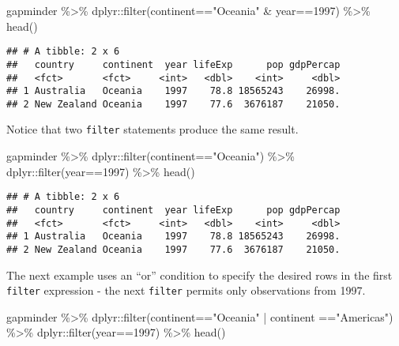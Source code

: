 \documentclass[
]{book}
\newenvironment{Shaded}{\begin{snugshade}}{\end{snugshade}}
\newcommand{\DecValTok}[1]{\textcolor[rgb]{0.00,0.00,0.81}{#1}}
\newcommand{\FunctionTok}[1]{\textcolor[rgb]{0.00,0.00,0.00}{#1}}
\newcommand{\NormalTok}[1]{#1}
\newcommand{\SpecialCharTok}[1]{\textcolor[rgb]{0.00,0.00,0.00}{#1}}
\newcommand{\StringTok}[1]{\textcolor[rgb]{0.31,0.60,0.02}{#1}}
\begin{document}
\begin{Shaded}
\begin{Highlighting}[]
\NormalTok{gapminder }\SpecialCharTok{\%\textgreater{}\%} 
\NormalTok{  dplyr}\SpecialCharTok{::}\FunctionTok{filter}\NormalTok{(continent}\SpecialCharTok{==}\StringTok{"Oceania"} \SpecialCharTok{\&}\NormalTok{ year}\SpecialCharTok{==}\DecValTok{1997}\NormalTok{) }\SpecialCharTok{\%\textgreater{}\%} 
  \FunctionTok{head}\NormalTok{()}
\end{Highlighting}
\end{Shaded}

\begin{verbatim}
## # A tibble: 2 x 6
##   country     continent  year lifeExp      pop gdpPercap
##   <fct>       <fct>     <int>   <dbl>    <int>     <dbl>
## 1 Australia   Oceania    1997    78.8 18565243    26998.
## 2 New Zealand Oceania    1997    77.6  3676187    21050.
\end{verbatim}

Notice that two \texttt{filter} statements produce the same result.

\begin{Shaded}
\begin{Highlighting}[]
\NormalTok{gapminder }\SpecialCharTok{\%\textgreater{}\%} 
\NormalTok{  dplyr}\SpecialCharTok{::}\FunctionTok{filter}\NormalTok{(continent}\SpecialCharTok{==}\StringTok{"Oceania"}\NormalTok{) }\SpecialCharTok{\%\textgreater{}\%} 
\NormalTok{  dplyr}\SpecialCharTok{::}\FunctionTok{filter}\NormalTok{(year}\SpecialCharTok{==}\DecValTok{1997}\NormalTok{) }\SpecialCharTok{\%\textgreater{}\%}
  \FunctionTok{head}\NormalTok{()}
\end{Highlighting}
\end{Shaded}

\begin{verbatim}
## # A tibble: 2 x 6
##   country     continent  year lifeExp      pop gdpPercap
##   <fct>       <fct>     <int>   <dbl>    <int>     <dbl>
## 1 Australia   Oceania    1997    78.8 18565243    26998.
## 2 New Zealand Oceania    1997    77.6  3676187    21050.
\end{verbatim}

The next example uses an ``or'' condition to specify the desired rows in the first \texttt{filter} expression - the next \texttt{filter} permits only observations from 1997.

\begin{Shaded}
\begin{Highlighting}[]
\NormalTok{gapminder }\SpecialCharTok{\%\textgreater{}\%} 
\NormalTok{  dplyr}\SpecialCharTok{::}\FunctionTok{filter}\NormalTok{(continent}\SpecialCharTok{==}\StringTok{"Oceania"} \SpecialCharTok{|}\NormalTok{ continent }\SpecialCharTok{==}\StringTok{"Americas"}\NormalTok{) }\SpecialCharTok{\%\textgreater{}\%}
\NormalTok{  dplyr}\SpecialCharTok{::}\FunctionTok{filter}\NormalTok{(year}\SpecialCharTok{==}\DecValTok{1997}\NormalTok{) }\SpecialCharTok{\%\textgreater{}\%} 
  \FunctionTok{head}\NormalTok{()}
\end{Highlighting}
\end{Shaded}
\end{document}
